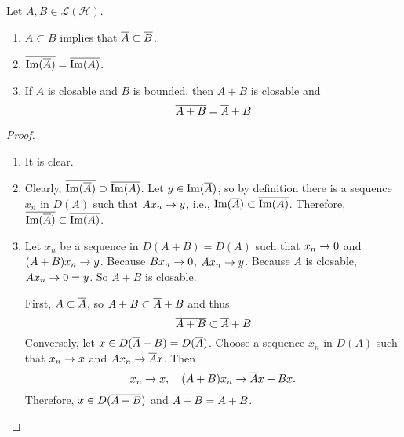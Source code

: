 \documentclass[a4paper,12pt]{article}
\begin{document}
\begin{prop}
    Let $A,B \in \mathcal{L}(\mathcal{H})$.
    \begin{enumerate}[label=(\arabic{*})]
        \item $A \subset B$ implies that $\overline{A} \subset \overline{B}$.
        \item $\overline{\operatorname{Im}(\overline{A})} = \overline{\operatorname{Im}(A)}$.
        \item If $A$ is closable and $B$ is bounded, then $A+B$ is closable and 
        \begin{equation*}
            \overline{A+B} = \overline{A} + B
        \end{equation*}
    \end{enumerate}
\end{prop}
\begin{proof}
    \begin{enumerate}[label=(\arabic{*})]
        \item It is clear.
        \item Clearly, $\overline{\operatorname{Im}(\overline{A})} \supset \overline{\operatorname{Im}(A)}$. Let $y \in \operatorname{Im}(\overline{A})$, so by definition there is a sequence $x_n$ in $D(A)$ such that $Ax_n \rightarrow y$, i.e., $\operatorname{Im}(\overline{A}) \subset \overline{\operatorname{Im}(A)}$. Therefore, $\overline{\operatorname{Im}(\overline{A})} \subset \overline{\operatorname{Im}(A)}$.
        \item Let $x_n$ be a sequence in $D(A+B) = D(A)$ such that $x_n \rightarrow 0$ and $(A+B)x_n \rightarrow y$. Because $Bx_n \rightarrow 0$, $Ax_n \rightarrow y$. Because $A$ is closable, $Ax_n \rightarrow 0 = y$. So $A+B$ is closable.

        First, $A \subset \overline{A}$, so $A+B \subset \overline{A} + B$ and thus
        \begin{equation*}
            \overline{A + B} \subset \overline{A} + B
        \end{equation*}
        Conversely, let $x \in D(\overline{A}+B) = D(\overline{A})$. Choose a sequence $x_n$ in $D(A)$ such that $x_n \rightarrow x$ and $Ax_n \rightarrow \overline{A}x$. Then
        \begin{equation*}
            x_n \rightarrow x,\quad (A+B)x_n \rightarrow \overline{A}x + Bx.
        \end{equation*}
        Therefore, $x \in D(\overline{A+B})$ and $\overline{A+B} = \overline{A}+B$.
    \end{enumerate}
\end{proof}
\end{document}
